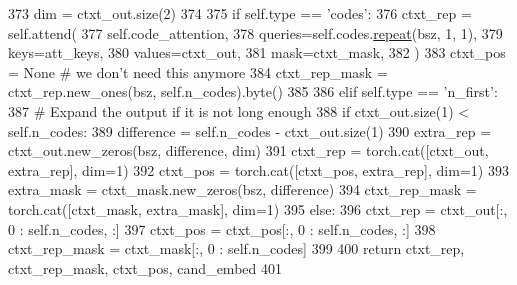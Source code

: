 \begin{DoxyCode}
373             dim = ctxt\_out.size(2)
374 
375             \textcolor{keywordflow}{if} self.type == \textcolor{stringliteral}{'codes'}:
376                 ctxt\_rep = self.attend(
377                     self.code\_attention,
378                     queries=self.codes.\hyperlink{namespacerepeat}{repeat}(bsz, 1, 1),
379                     keys=att\_keys,
380                     values=ctxt\_out,
381                     mask=ctxt\_mask,
382                 )
383                 ctxt\_pos = \textcolor{keywordtype}{None}  \textcolor{comment}{# we don't need this anymore}
384                 ctxt\_rep\_mask = ctxt\_rep.new\_ones(bsz, self.n\_codes).byte()
385 
386             \textcolor{keywordflow}{elif} self.type == \textcolor{stringliteral}{'n\_first'}:
387                 \textcolor{comment}{# Expand the output if it is not long enough}
388                 \textcolor{keywordflow}{if} ctxt\_out.size(1) < self.n\_codes:
389                     difference = self.n\_codes - ctxt\_out.size(1)
390                     extra\_rep = ctxt\_out.new\_zeros(bsz, difference, dim)
391                     ctxt\_rep = torch.cat([ctxt\_out, extra\_rep], dim=1)
392                     ctxt\_pos = torch.cat([ctxt\_pos, extra\_rep], dim=1)
393                     extra\_mask = ctxt\_mask.new\_zeros(bsz, difference)
394                     ctxt\_rep\_mask = torch.cat([ctxt\_mask, extra\_mask], dim=1)
395                 \textcolor{keywordflow}{else}:
396                     ctxt\_rep = ctxt\_out[:, 0 : self.n\_codes, :]
397                     ctxt\_pos = ctxt\_pos[:, 0 : self.n\_codes, :]
398                     ctxt\_rep\_mask = ctxt\_mask[:, 0 : self.n\_codes]
399 
400         \textcolor{keywordflow}{return} ctxt\_rep, ctxt\_rep\_mask, ctxt\_pos, cand\_embed
401 
\end{DoxyCode}
\mbox{\label{classparlai_1_1agents_1_1transformer_1_1polyencoder_1_1PolyEncoderModule_a9e769210d947e88dc3e4555583b9c82e}} 
